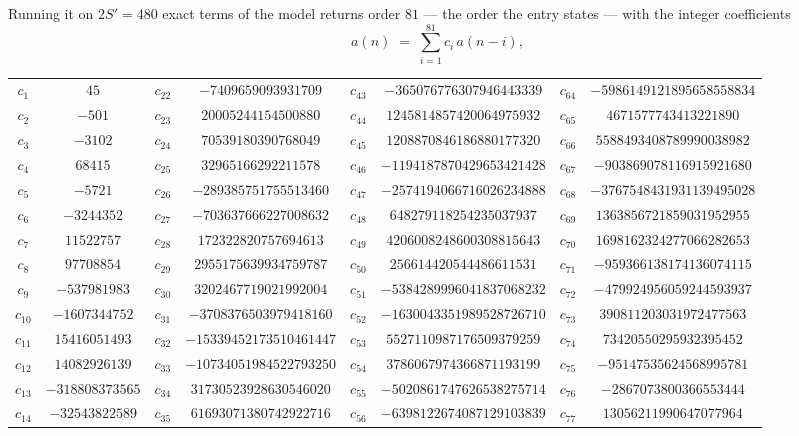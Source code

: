 \documentclass[11pt,a4paper]{article}
\theoremstyle{plain}
\theoremstyle{definition}
\begin{document}
Running it on $2S'=480$ exact terms of the model returns order $81$ --- the order the
entry states --- with the integer coefficients
\[
a(n)\;=\;\sum_{i=1}^{81}c_i\,a(n-i),
\]
\begin{center}\small
\begin{tabular}{cccccccc}
$c_{1}$ & $45$ & $c_{22}$ & $-7409659093931709$ & $c_{43}$ & $-365076776307946443339$ & $c_{64}$ & $-5986149121895658558834$ \\
$c_{2}$ & $-501$ & $c_{23}$ & $20005244154500880$ & $c_{44}$ & $1245814857420064975932$ & $c_{65}$ & $4671577743413221890$ \\
$c_{3}$ & $-3102$ & $c_{24}$ & $70539180390768049$ & $c_{45}$ & $1208870846186880177320$ & $c_{66}$ & $5588493408789990038982$ \\
$c_{4}$ & $68415$ & $c_{25}$ & $32965166292211578$ & $c_{46}$ & $-1194187870429653421428$ & $c_{67}$ & $-903869078116915921680$ \\
$c_{5}$ & $-5721$ & $c_{26}$ & $-289385751755513460$ & $c_{47}$ & $-2574194066716026234888$ & $c_{68}$ & $-3767548431931139495028$ \\
$c_{6}$ & $-3244352$ & $c_{27}$ & $-703637666227008632$ & $c_{48}$ & $648279118254235037937$ & $c_{69}$ & $1363856721859031952955$ \\
$c_{7}$ & $11522757$ & $c_{28}$ & $172322820757694613$ & $c_{49}$ & $4206008248600308815643$ & $c_{70}$ & $1698162324277066282653$ \\
$c_{8}$ & $97708854$ & $c_{29}$ & $2955175639934759787$ & $c_{50}$ & $256614420544486611531$ & $c_{71}$ & $-959366138174136074115$ \\
$c_{9}$ & $-537981983$ & $c_{30}$ & $3202467719021992004$ & $c_{51}$ & $-5384289996041837068232$ & $c_{72}$ & $-479924956059244593937$ \\
$c_{10}$ & $-1607344752$ & $c_{31}$ & $-3708376503979418160$ & $c_{52}$ & $-1630043351989528726710$ & $c_{73}$ & $390811203031972477563$ \\
$c_{11}$ & $15416051493$ & $c_{32}$ & $-15339452173510461447$ & $c_{53}$ & $5527110987176509379259$ & $c_{74}$ & $73420550295932395452$ \\
$c_{12}$ & $14082926139$ & $c_{33}$ & $-10734051984522793250$ & $c_{54}$ & $3786067974366871193199$ & $c_{75}$ & $-95147535624568995781$ \\
$c_{13}$ & $-318808373565$ & $c_{34}$ & $31730523928630546020$ & $c_{55}$ & $-5020861747626538275714$ & $c_{76}$ & $-2867073800366553444$ \\
$c_{14}$ & $-32543822589$ & $c_{35}$ & $61693071380742922716$ & $c_{56}$ & $-6398122674087129103839$ & $c_{77}$ & $13056211990647077964$ \\

\end{tabular}
\end{center}
\end{document}
